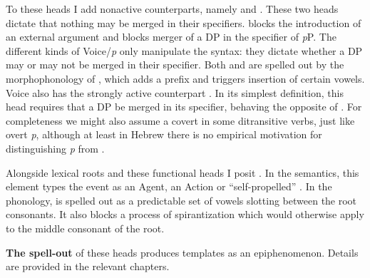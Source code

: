 \begin{exe}
\begin{xlist}
\begin{exe}
\begin{exe}
\begin{exe}
\begin{exe}
\begin{xlist}
\begin{exe}
\begin{xlist}
\begin{xlist}
\begin{xlist}
\begin{exe}
\begin{xlist}
\begin{exe}
\begin{exe}
\begin{exe}
\begin{exe}
\begin{xlist}
\begin{exe}
\begin{xlist}
\begin{exe}
\begin{exe}
\begin{xlist}
\begin{exe}
\begin{xlist}
\begin{exe}
\begin{xlist}
\begin{exe}
\begin{exe}
\begin{xlist}
\begin{exe}
\begin{exe}
\begin{xlist}
\begin{exe}
\begin{exe}
\begin{xlist}
\begin{exe}
\begin{exe}
\begin{xlist}
\begin{exe}
\begin{xlist}
\begin{exe}
\begin{exe}
\begin{exe}
\begin{exe}
\begin{xlist}
\begin{exe}
\begin{xlist}
\begin{exe}
\begin{exe}
\begin{exe}
\begin{exe}
\begin{exe}
\begin{exe}
\begin{xlist}
\begin{exe}
\begin{exe}
\begin{exe}
\begin{xlist}
To these heads I add nonactive counterparts, namely \textbf{\vz} and \textbf{\pz}. These two heads dictate that nothing may be merged in their specifiers. {\vz} blocks the introduction of an external argument and {\pz} blocks merger of a DP in the specifier of \textit{p}P. The different kinds of Voice/\emph{p} only manipulate the syntax: they dictate whether a DP may or may not be merged in their specifier. Both {\vz} and {\pz} are spelled out by the morphophonology of {\tnif}, which adds a prefix and triggers insertion of certain vowels. Voice also has the strongly active counterpart \textbf{\vd}. In its simplest definition, this head requires that a DP be merged in its specifier, behaving the opposite of {\vz}. For completeness we might also assume a covert \textbf{\pd} in some ditransitive verbs, just like overt \emph{p}, although at least in Hebrew there is no empirical motivation for distinguishing \emph{p} from {\pd}.\label{r1:g:2b}

Alongside lexical roots and these functional heads I posit \textbf{\va}. In the semantics, this {element} types the event as an Agent, an Action \citep{doron03} or ``self-propelled'' \citep{folliharley08}. In the phonology, {\va} is spelled out as a predictable set of vowels slotting between the root consonants. It also blocks a process of spirantization which would otherwise apply to the middle consonant of the root.

\textbf{The spell-out} of these heads produces templates as an epiphenomenon. Details are provided in the relevant chapters.


\end{xlist}
\end{exe}
\end{exe}
\end{exe}
\end{xlist}
\end{exe}
\end{exe}
\end{exe}
\end{exe}
\end{exe}
\end{exe}
\end{xlist}
\end{exe}
\end{xlist}
\end{exe}
\end{exe}
\end{exe}
\end{exe}
\end{xlist}
\end{exe}
\end{xlist}
\end{exe}
\end{exe}
\end{xlist}
\end{exe}
\end{exe}
\end{xlist}
\end{exe}
\end{exe}
\end{xlist}
\end{exe}
\end{exe}
\end{xlist}
\end{exe}
\end{xlist}
\end{exe}
\end{xlist}
\end{exe}
\end{exe}
\end{xlist}
\end{exe}
\end{xlist}
\end{exe}
\end{exe}
\end{exe}
\end{exe}
\end{xlist}
\end{exe}
\end{xlist}
\end{xlist}
\end{xlist}
\end{exe}
\end{xlist}
\end{exe}
\end{exe}
\end{exe}
\end{exe}
\end{xlist}
\end{exe}

